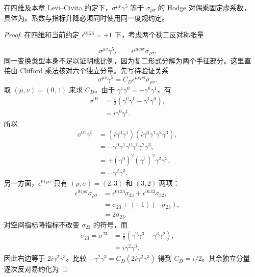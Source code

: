 \begin{lemma}
在四维及本章 Levi--Civita 约定下，$\sigma^{\mu\nu}\gamma^5$ 等于 $\sigma_{\rho\sigma}$ 的 Hodge 对偶乘固定虚系数，具体为。系数与指标升降必须同时使用同一度规约定。
\end{lemma}

\begin{proof}
在四维和当前约定 $\epsilon^{0123}=+1$ 下，考虑两个秩二反对称张量

\begin{equation*}
\sigma^{\mu\nu}\gamma^5,
\qquad
\epsilon^{\mu\nu\rho\sigma}\sigma_{\rho\sigma}.
\end{equation*}
同一变换类型本身不足以证明成比例，因为复二形式分解为两个手征部分。这里直接由 Clifford 乘法核对六个独立分量。先写待验证关系
\begin{equation*}
\sigma^{\mu\nu}\gamma^5
=C_D\epsilon^{\mu\nu\rho\sigma}\sigma_{\rho\sigma}.
\end{equation*}
取 $(\mu,\nu)=(0,1)$ 来求 $C_D$。由于
$\gamma^1\gamma^0=-\gamma^0\gamma^1$，有
\begin{align*}
\sigma^{01}
&=\frac{i}{2}(\gamma^0\gamma^1-\gamma^1\gamma^0),\\
&=i\gamma^0\gamma^1.
\end{align*}
所以
\begin{align*}
\sigma^{01}\gamma^5
&=(i\gamma^0\gamma^1)
(i\gamma^0\gamma^1\gamma^2\gamma^3),\\
&=-\gamma^0\gamma^1\gamma^0\gamma^1\gamma^2\gamma^3,\\
&=+(\gamma^0)^2(\gamma^1)^2\gamma^2\gamma^3,\\
&=-\gamma^2\gamma^3.
\end{align*}
另一方面，$\epsilon^{01\rho\sigma}$ 只有 $(\rho,\sigma)=(2,3)$ 和 $(3,2)$ 两项：
\begin{align*}
\epsilon^{01\rho\sigma}\sigma_{\rho\sigma}
&=\epsilon^{0123}\sigma_{23}+\epsilon^{0132}\sigma_{32},\\
&=\sigma_{23}+(-1)(-\sigma_{23}),\\
&=2\sigma_{23}.
\end{align*}
对空间指标降指标不改变 $\sigma_{23}$ 的符号，而
\begin{align*}
\sigma_{23}=\sigma^{23}
&=\frac{i}{2}(\gamma^2\gamma^3-\gamma^3\gamma^2),\\
&=i\gamma^2\gamma^3.
\end{align*}
因此右边等于 $2i\gamma^2\gamma^3$。比较
$-\gamma^2\gamma^3=C_D(2i\gamma^2\gamma^3)$ 得到
$C_D=i/2$。其余独立分量逐次反对易约化为

\end{proof}
